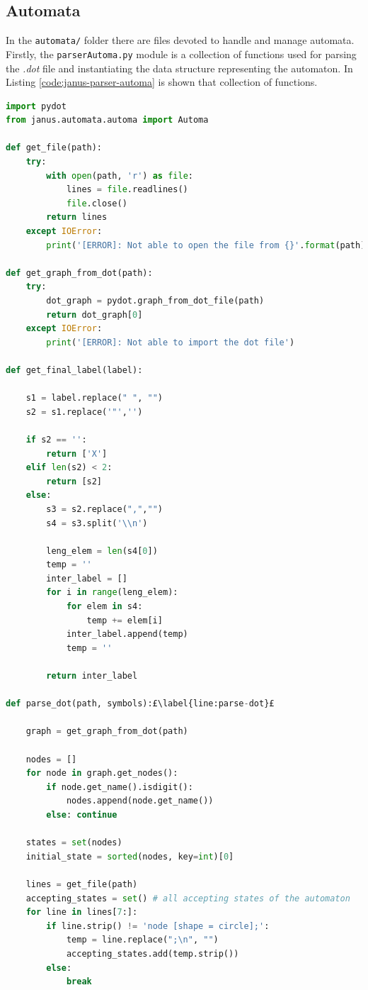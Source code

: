 \subsection{Automata}
In the \texttt{automata/} folder there are files devoted to handle and manage automata. Firstly, the \texttt{parserAutoma.py} module is a collection of functions used for parsing the \textit{.dot} file and instantiating the data structure representing the automaton. In Listing \ref{code:janus-parser-automa} is shown that collection of functions.
\begin{lstlisting}[language=Python, style=Python, escapechar = £, label={code:janus-parser-automa}, caption={The \texttt{parserAutoma.py} module}]
import pydot
from janus.automata.automa import Automa

def get_file(path):
    try:
        with open(path, 'r') as file:
            lines = file.readlines()
            file.close()
        return lines
    except IOError:
        print('[ERROR]: Not able to open the file from {}'.format(path))

def get_graph_from_dot(path):
    try:
        dot_graph = pydot.graph_from_dot_file(path)
        return dot_graph[0]
    except IOError:
        print('[ERROR]: Not able to import the dot file')

def get_final_label(label):

    s1 = label.replace(" ", "")
    s2 = s1.replace('"','')

    if s2 == '':
        return ['X']
    elif len(s2) < 2:
        return [s2]
    else:
        s3 = s2.replace(",","")
        s4 = s3.split('\\n')

        leng_elem = len(s4[0])
        temp = ''
        inter_label = []
        for i in range(leng_elem):
            for elem in s4:
                temp += elem[i]
            inter_label.append(temp)
            temp = ''

        return inter_label

def parse_dot(path, symbols):£\label{line:parse-dot}£

    graph = get_graph_from_dot(path)

    nodes = []
    for node in graph.get_nodes():
        if node.get_name().isdigit():
            nodes.append(node.get_name())
        else: continue

    states = set(nodes)
    initial_state = sorted(nodes, key=int)[0]

    lines = get_file(path)
    accepting_states = set() # all accepting states of the automaton
    for line in lines[7:]:
        if line.strip() != 'node [shape = circle];':
            temp = line.replace(";\n", "")
            accepting_states.add(temp.strip())
        else:
            break


\end{lstlisting}
